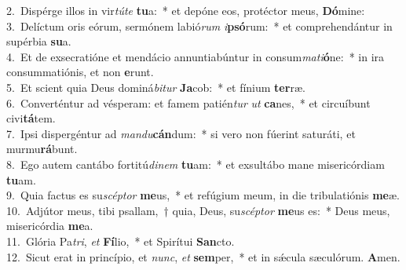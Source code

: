{2.~}Dispérge illos in vir\textit{tú}\textit{te} \textbf{tu}a:~* et depóne eos, protéctor meus, \textbf{Dó}mine:\\
{3.~}Delíctum oris eórum, sermónem labió\textit{rum} \textit{i}\textbf{psó}rum:~* et comprehendántur in supérbia \textbf{su}a.\\
{4.~}Et de exsecratióne et mendácio annuntiabúntur in consum\textit{ma}\textit{ti}\textbf{ó}ne:~* in ira consummatiónis, et non \textbf{e}runt.\\
{5.~}Et scient quia Deus dominá\textit{bi}\textit{tur} \textbf{Ja}cob:~* et fínium \textbf{ter}ræ.\\
{6.~}Converténtur ad vésperam: et famem patién\textit{tur} \textit{ut} \textbf{ca}nes,~* et circuíbunt civi\textbf{tá}tem.\\
{7.~}Ipsi dispergéntur ad \textit{man}\textit{du}\textbf{cán}dum:~* si vero non fúerint saturáti, et murmu\textbf{rá}bunt.\\
{8.~}Ego autem cantábo fortitú\textit{di}\textit{nem} \textbf{tu}am:~* et exsultábo mane misericórdiam \textbf{tu}am.\\
{9.~}Quia factus es su\textit{scép}\textit{tor} \textbf{me}us,~* et refúgium meum, in die tribulatiónis \textbf{me}æ.\\
{10.~}Adjútor meus, tibi psallam,~† quia, Deus, su\textit{scép}\textit{tor} \textbf{me}us es:~* Deus meus, misericórdia \textbf{me}a.\\
{11.~}Glória Pa\textit{tri}, \textit{et} \textbf{Fí}lio,~* et Spirítui \textbf{San}cto.\\
{12.~}Sicut erat in princípio, et \textit{nunc}, \textit{et} \textbf{sem}per,~* et in sǽcula sæculórum. \textbf{A}men.\\
